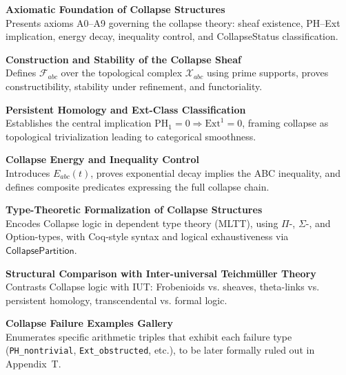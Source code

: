 \documentclass[11pt]{article}
\begin{document}
\begin{description}[leftmargin=3.6cm, labelsep=1.0cm]

\item[\textbf{Appendix A}]  
\textbf{Axiomatic Foundation of Collapse Structures}  
\\
Presents axioms A0--A9 governing the collapse theory: sheaf existence, PH–Ext implication, energy decay,  
inequality control, and CollapseStatus classification.

\item[\textbf{Appendix B}]  
\textbf{Construction and Stability of the Collapse Sheaf}  
\\
Defines \( \mathcal{F}_{abc} \) over the topological complex \( \mathcal{X}_{abc} \) using prime supports,  
proves constructibility, stability under refinement, and functoriality.

\item[\textbf{Appendix C}]  
\textbf{Persistent Homology and Ext-Class Classification}  
\\
Establishes the central implication \( \mathrm{PH}_1 = 0 \Rightarrow \mathrm{Ext}^1 = 0 \),  
framing collapse as topological trivialization leading to categorical smoothness.

\item[\textbf{Appendix D}]  
\textbf{Collapse Energy and Inequality Control}  
\\
Introduces \( E_{abc}(t) \), proves exponential decay implies  
the ABC inequality, and defines composite predicates expressing the full collapse chain.

\item[\textbf{Appendix E}]  
\textbf{Type-Theoretic Formalization of Collapse Structures}  
\\
Encodes Collapse logic in dependent type theory (MLTT), using \( \Pi \)-, \( \Sigma \)-, and Option-types,  
with Coq-style syntax and logical exhaustiveness via \( \mathsf{CollapsePartition} \).

\item[\textbf{Appendix F}]  
\textbf{Structural Comparison with Inter-universal Teichmüller Theory}  
\\
Contrasts Collapse logic with IUT: Frobenioids vs. sheaves,  
theta-links vs. persistent homology, transcendental vs. formal logic.

\item[\textbf{Appendix G}]  
\textbf{Collapse Failure Examples Gallery}  
\\
Enumerates specific arithmetic triples that exhibit each failure type  
(\texttt{PH\_nontrivial}, \texttt{Ext\_obstructed}, etc.),  
to be later formally ruled out in Appendix~T.


\end{description}
\end{document}
